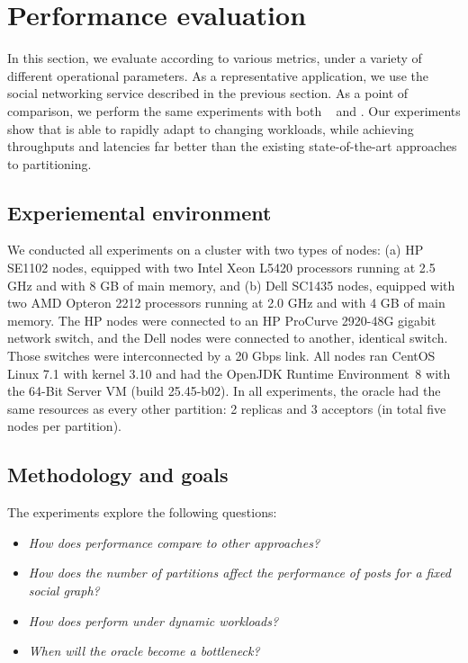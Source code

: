 \section{Performance evaluation}
\label{sec:experiments}

In this section, we evaluate \dynastar{} according to various metrics,
under a variety of different operational parameters.  As a
representative application, we use the \appname{} social networking
service described in the previous section.  As a point of comparison,
we perform the same experiments with both
\ssmr{}~\cite{bezerra2014ssmr} and \dssmr. Our experiments show that
\dynastar{} is able to rapidly adapt to changing workloads, while
achieving throughputs and latencies far better than the existing
state-of-the-art approaches to partitioning.


\subsection{Experiemental environment}
\label{sec:evaluation:setup}

We conducted all experiments on a cluster with two types of nodes: (a)
HP SE1102 nodes, equipped with two Intel Xeon L5420 processors running
at 2.5 GHz and with 8 GB of main memory, and (b) Dell SC1435 nodes,
equipped with two AMD Opteron 2212 processors running at 2.0 GHz and
with 4 GB of main memory. The HP nodes were connected to an HP
ProCurve 2920-48G gigabit network switch, and the Dell nodes were
connected to another, identical switch. Those switches were
interconnected by a 20 Gbps link.  All nodes ran CentOS Linux 7.1 with
kernel 3.10 and had the OpenJDK Runtime Environment~8 with the
\mbox{64-Bit} Server VM (build 25.45-b02). In all experiments, the oracle 
had the same resources as every other partition: 2 replicas and 3 acceptors 
(in total five nodes per partition).


\subsection{Methodology and goals}
\label{sec:evaluation:methodology}

The experiments explore the following questions:
\begin{itemize}
\item \emph{How does \dynastar performance compare to other approaches?} 
\item \emph{How does the number of partitions affect the performance of posts for a fixed social graph?}
\item \emph{How does \dynastar perform under dynamic workloads?}
\item \emph{When will the oracle become a bottleneck?}
\end{itemize}




